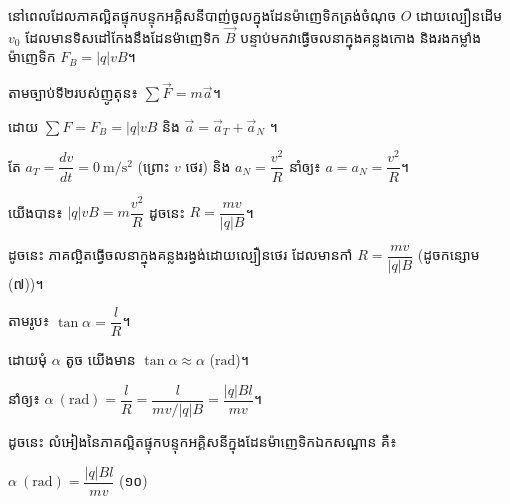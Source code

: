 \noindent
\begin{minipage}[t]{0.55\textwidth}
	\raggedright
	នៅពេលដែលភាគល្អិតផ្ទុកបន្ទុកអគ្គិសនីបាញ់ចូលក្នុងដែនម៉ាញេទិកត្រង់ចំណុច $O$ ដោយល្បឿនដើម $v_0$ ដែលមានទិសដៅកែងនឹងដែនម៉ាញេទិក $\vec{B}$ បន្ទាប់មកវាធ្វើចលនាក្នុងគន្លងកោង និងរងកម្លាំងម៉ាញេទិក $F_B = |q|vB$។

	\vspace{0.5em}
	តាមច្បាប់ទី២របស់ញូតុន៖ $\sum\vec{F} = m\vec{a}$។

	\vspace{0.3em}
	ដោយ $\sum F = F_B = |q|vB$ និង $\vec{a} = \vec{a}_T + \vec{a}_N$ ។

	\vspace{0.3em}
	តែ $a_T = \dfrac{dv}{dt} = 0\ \mathrm{m/s^2}$ (ព្រោះ $v$ ថេរ) និង $a_N = \dfrac{v^2}{R}$ នាំឲ្យ៖ $a = a_N = \dfrac{v^2}{R}$។

	\vspace{0.3em}
	យើងបាន៖ $|q|vB = m\dfrac{v^2}{R}$ ដូចនេះ $R = \dfrac{mv}{|q|B}$។
\end{minipage}%
\hfill
\begin{minipage}[t]{0.40\textwidth}
	\vspace{0pt}
	\hspace*{0.5em}%
\end{minipage}

\vspace{0.5em}
\noindent
ដូចនេះ ភាគល្អិតធ្វើចលនាក្នុងគន្លងរង្វង់ដោយល្បឿនថេរ ដែលមានកាំ $R = \dfrac{mv}{|q|B}$ (ដូចកន្សោម (៧))។

\vspace{0.9em}

\noindent
តាមរូប៖ $\tan\alpha = \dfrac{l}{R}$។

\vspace{0.3em}
ដោយមុំ $\alpha$ តូច យើងមាន $\tan\alpha \approx \alpha$ ($\mathrm{rad}$)។

\vspace{0.3em}
នាំឲ្យ៖ $\alpha\ (\mathrm{rad}) = \dfrac{l}{R} = \dfrac{l}{mv/|q|B} = \dfrac{|q|Bl}{mv}$។

\vspace{0.7em}
\noindent
ដូចនេះ លំអៀងនៃភាគល្អិតផ្ទុកបន្ទុកអគ្គិសនីក្នុងដែនម៉ាញេទិកឯកសណ្ឋាន គឺ៖

\vspace{0.4em}
\begin{center}
	$\boxed{\alpha\ (\mathrm{rad}) = \dfrac{|q|Bl}{mv}}$ \quad (១០)
\end{center}

